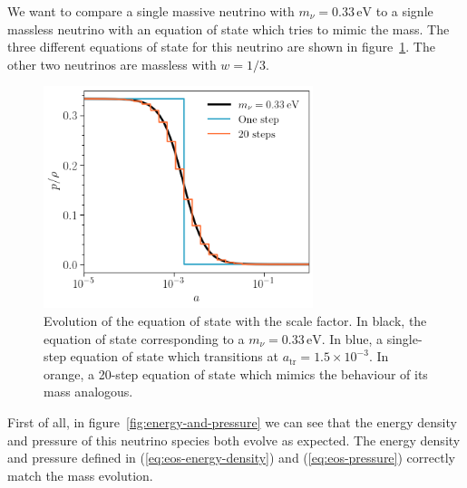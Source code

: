 We want to compare a single massive neutrino with $m_\nu = 0.33\, \mathrm{eV}$ to a signle massless neutrino with an equation of state which tries to mimic the mass. The three different equations of state for this neutrino are shown in figure~\ref{fig:equation-of-states}. The other two neutrinos are massless with $w = 1/3$. 
\begin{figure}
    \centering
    \includegraphics[width = 0.7\textwidth]{"Figures/eos_330meV.png"}
    \caption{Evolution of the equation of state with the scale factor. In black, the equation of state corresponding to a $m_\nu = 0.33\, \mathrm{eV}$. In blue, a single-step equation of state which transitions at $a_{\mathrm{tr}} = 1.5\times 10^{-3}$. In orange, a 20-step equation of state which mimics the behaviour of its mass analogous.}
    \label{fig:equation-of-states}
\end{figure}

First of all, in figure~\ref{fig:energy-and-pressure} we can see that the energy density and pressure of this neutrino species both evolve as expected. The energy density and pressure defined in (\ref{eq:eos-energy-density}) and (\ref{eq:eos-pressure}) correctly match the mass evolution. 

